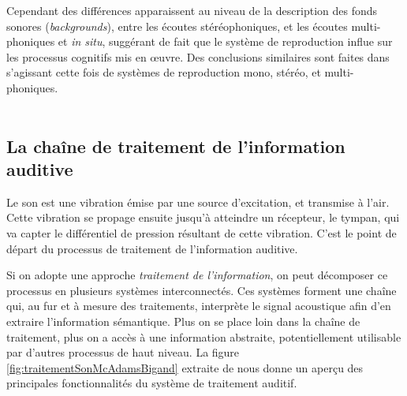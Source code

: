 Cependant des différences apparaissent au niveau de la description des fonds sonores (\emph{backgrounds}), entre les écoutes stéréophoniques, et les écoutes multi-phoniques et \emph{in situ}, suggérant de fait que le système de reproduction influe sur les processus cognitifs mis en œuvre. Des conclusions similaires sont faites dans \citep{guastavino2004perceptual} s'agissant cette fois de systèmes de reproduction mono, stéréo, et multi-phoniques. \\

 \\

\subsection{La chaîne de traitement de l'information auditive}
\label{sec:chaineTaite}

Le son est une vibration émise par une source d'excitation, et transmise à l'air. Cette vibration se propage ensuite jusqu'à atteindre un récepteur, le tympan, qui va capter le différentiel de pression résultant de cette vibration. C'est le point de départ du processus de traitement de l'information auditive. 

Si on adopte une approche \emph{traitement de l'information}, on peut décomposer ce processus en plusieurs systèmes interconnectés. Ces systèmes forment une chaîne qui, au fur et à mesure des traitements, interprète le signal acoustique afin d'en extraire l'information sémantique. Plus on se place loin dans la chaîne de traitement, plus on a accès à une information abstraite, potentiellement utilisable par d'autres processus de haut niveau. La figure \ref{fig:traitementSonMcAdamsBigand} extraite de \citep{mcadams1994penser} nous donne un aperçu des principales fonctionnalités du système de traitement auditif.

